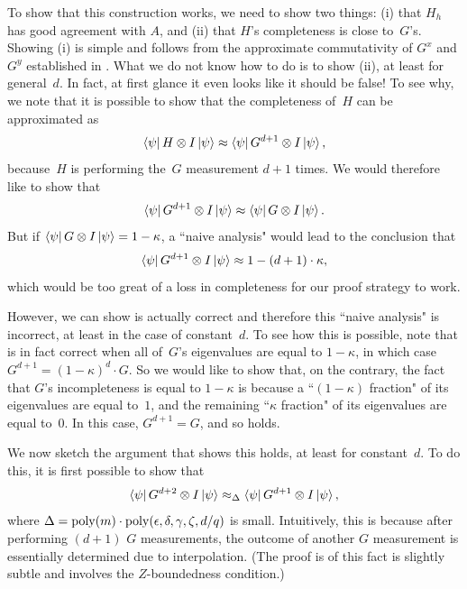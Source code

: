 To show that this construction works,
we need to show two things: (i) that $H_h$ has good agreement with $A$,
and (ii) that $H$'s completeness is close to~$G$'s.
Showing (i) is simple and follows from
the approximate commutativity of $G^{x}$ and $G^{y}$ established in .
What we do not know how to do is to show (ii),
at least for general~$d$.
In fact, at first glance it even looks like it should be false!
To see why,
we note that it is possible to show that the completeness of~$H$ can be approximated as
\begin{equation*}
\bra{\psi} H \otimes I \ket{\psi} \approx \bra{\psi} G^{d+1} \otimes I \ket{\psi},
\end{equation*}
because~$H$ is performing the~$G$ measurement $d+1$ times.
We would therefore like to show that
\begin{equation}\label{eq:subtract-a-G}
\bra{\psi} G^{d+1}\otimes I \ket{\psi}
\approx \bra{\psi} G\otimes I \ket{\psi}.
\end{equation}
But if $\bra{\psi} G \otimes I \ket{\psi} = 1-\kappa$,
a ``naive analysis" would lead to the conclusion that
\begin{equation}\label{eq:dumbo-bound-for-idiots}
\bra{\psi} G^{d+1}\otimes I \ket{\psi} \approx 1 - (d+1) \cdot \kappa,
\end{equation}
which would be too great of a loss in completeness for our proof strategy to work.

However, we can show  is actually correct
and therefore this ``naive analysis" is incorrect,
at least in the case of constant~$d$.
To see how this is possible,
note that  is in fact correct when all of~$G$'s eigenvalues are equal to $1-\kappa$,
in which case $G^{d+1} = (1-\kappa)^d \cdot G$.
So we would like to show that, on the contrary,
the fact that $G$'s incompleteness is equal to $1-\kappa$
is because a ``$(1-\kappa)$ fraction" of its eigenvalues are equal to~$1$,
and the remaining ``$\kappa$ fraction" of its eigenvalues are equal to~$0$.
In this case, $G^{d+1} = G$, and so  holds.

We now sketch the argument that shows this holds, at least for constant~$d$.
To do this, it is first possible to show that
\begin{equation}\label{eq:step-one-of-grand-plan}
\bra{\psi} G^{d+2} \otimes I \ket{\psi}
\approx_{\Delta} \bra{\psi} G^{d+1} \otimes I \ket{\psi},
\end{equation}
where $\Delta = \mathrm{poly}(m) \cdot \mathrm{poly}(\epsilon, \delta, \gamma, \zeta, d/q)$ is small.
Intuitively, this is because after performing $(d+1)$ $G$ measurements,
the outcome of another $G$ measurement is essentially determined due to interpolation.
(The proof is of this fact is slightly subtle and involves the $Z$-boundedness condition.)

